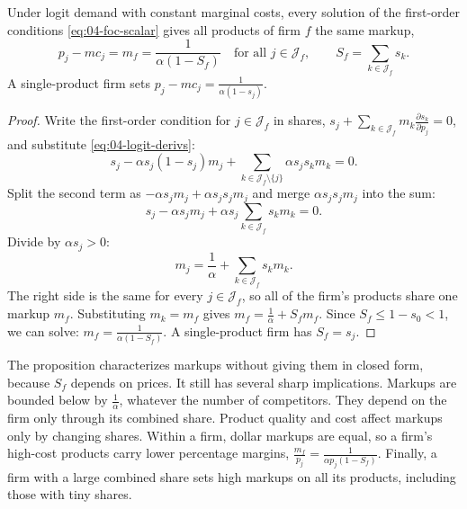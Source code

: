 \begin{proposition}\label{prop:04-logit-markup}
Under logit demand with constant marginal costs, every solution of the first-order conditions
\eqref{eq:04-foc-scalar} gives all products of firm $f$ the same markup,
\begin{equation*}
p_j - mc_j = m_f = \frac{1}{\alpha(1 - S_f)}
\quad \text{for all } j \in \mathcal{J}_f,
\qquad
S_f = \sum_{k \in \mathcal{J}_f}s_k.
\end{equation*}
A single-product firm sets $p_j - mc_j = \frac{1}{\alpha(1 - s_j)}$.
\end{proposition}

\begin{proof}
Write the first-order condition for $j \in \mathcal{J}_f$ in shares, $s_j + \sum_{k \in \mathcal{J}_f}m_k\frac{\partial s_k}{\partial p_j} = 0$,
and substitute \eqref{eq:04-logit-derivs}:
\begin{equation*}
s_j - \alpha s_j(1 - s_j)m_j + \sum_{k \in \mathcal{J}_f\setminus\{j\}}\alpha s_js_km_k = 0.
\end{equation*}
Split the second term as $-\alpha s_jm_j + \alpha s_js_jm_j$ and merge $\alpha s_js_jm_j$ into the sum:
\begin{equation*}
s_j - \alpha s_jm_j + \alpha s_j\sum_{k \in \mathcal{J}_f}s_km_k = 0.
\end{equation*}
Divide by $\alpha s_j > 0$:
\begin{equation*}
m_j = \frac{1}{\alpha} + \sum_{k \in \mathcal{J}_f}s_km_k.
\end{equation*}
The right side is the same for every $j \in \mathcal{J}_f$, so all of the firm's products share one markup $m_f$.
Substituting $m_k = m_f$ gives $m_f = \frac{1}{\alpha} + S_fm_f$. Since $S_f \le 1 - s_0 < 1$, we can solve:
$m_f = \frac{1}{\alpha(1 - S_f)}$. A single-product firm has $S_f = s_j$.
\end{proof}

The proposition characterizes markups without giving them in closed form, because $S_f$ depends on prices. It
still has several sharp implications. Markups are bounded below by $\frac{1}{\alpha}$, whatever the number of
competitors. They depend on the firm only through its combined share. Product quality and cost affect markups
only by changing shares. Within a firm, dollar markups are equal, so a firm's high-cost products carry lower
percentage margins, $\frac{m_f}{p_j} = \frac{1}{\alpha p_j(1 - S_f)}$. Finally, a firm with a large combined share
sets high markups on all its products, including those with tiny shares.

